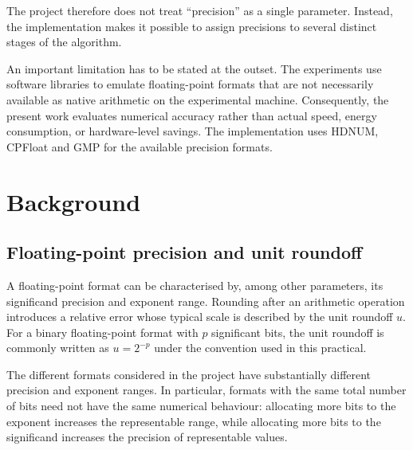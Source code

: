 \documentclass[a4paper,11pt]{article}
\begin{document}
The project therefore does not treat ``precision'' as a single parameter.
Instead, the implementation makes it possible to assign precisions to several
distinct stages of the algorithm.

An important limitation has to be stated at the outset. The experiments use
software libraries to emulate floating-point formats that are not necessarily
available as native arithmetic on the experimental machine. Consequently, the
present work evaluates numerical accuracy rather than actual speed, energy
consumption, or hardware-level savings. The implementation uses HDNUM, CPFloat
and GMP for the available precision formats.

\section{Background}

\subsection{Floating-point precision and unit roundoff}

A floating-point format can be characterised by, among other parameters, its
significand precision and exponent range. Rounding after an arithmetic
operation introduces a relative error whose typical scale is described by the
unit roundoff $u$. For a binary floating-point format with $p$ significant
bits, the unit roundoff is commonly written as $u = 2^{-p}$ 
under the convention used in this practical.

The different formats considered in the project have substantially different
precision and exponent ranges. In particular, formats with the same total
number of bits need not have the same numerical behaviour: allocating more
bits to the exponent increases the representable range, while allocating more
bits to the significand increases the precision of representable values.
\end{document}

